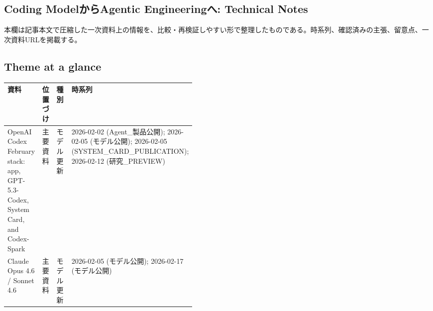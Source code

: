 \subsection*{Coding ModelからAgentic Engineeringへ: Technical Notes}
本欄は記事本文で圧縮した一次資料上の情報を、比較・再検証しやすい形で整理したものである。時系列、確認済みの主張、留意点、一次資料URLを掲載する。
\medskip
\subsection*{Theme at a glance}
\begin{center}
\footnotesize
\begin{tabularx}{\linewidth}{@{}p{0.20\linewidth}p{0.10\linewidth}p{0.14\linewidth}X@{}}
\toprule
資料 & 位置づけ & 種別 & 時系列 \\
\midrule
OpenAI Codex February stack: app, GPT-5.3-Codex, System Card, and Codex-Spark & 主要資料 & モデル更新 & 2026-02-02 (Agent\_製品公開); 2026-02-05 (モデル公開); 2026-02-05 (SYSTEM\_CARD\_PUBLICATION); 2026-02-12 (研究\_PREVIEW) \\
Claude Opus 4.6 / Sonnet 4.6 & 主要資料 & モデル更新 & 2026-02-05 (モデル公開); 2026-02-17 (モデル公開) \\
\bottomrule
\end{tabularx}
\end{center}
\normalsize

